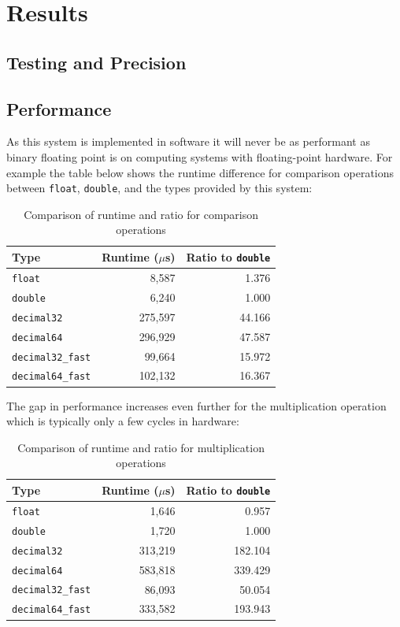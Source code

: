 \documentclass[acmsmall]{acmart}
\newcommand{\code}[1]{\texttt{#1}}
\begin{document}
\section{Results}
\subsection{Testing and Precision}
\subsection{Performance}

As this system is implemented in software it will never be as performant as binary floating point is on computing systems with floating-point hardware.
For example the table below shows the runtime difference for comparison operations between \code{float}, \code{double}, and the types provided by this system:

\begin{table}[t]
\centering
\begin{tabular}{|l|r|r|}
\hline
Type & Runtime ($\mu$s) & Ratio to \texttt{double} \\
\hline
\texttt{float} & 8,587 & 1.376 \\
\texttt{double} & 6,240 & 1.000 \\
\texttt{decimal32} & 275,597 & 44.166 \\
\texttt{decimal64} & 296,929 & 47.587 \\
\texttt{decimal32\_fast} & 99,664 & 15.972 \\
\texttt{decimal64\_fast} & 102,132 & 16.367 \\
\hline
\end{tabular}
\caption{Comparison of runtime and ratio for comparison operations}
\label{tab:comp-comparison}
\end{table}

The gap in performance increases even further for the multiplication operation which is typically only a few cycles in hardware\cite{arm_trm}:

\begin{table}[t]
\centering
\begin{tabular}{|l|r|r|}
\hline
Type & Runtime ($\mu$s) & Ratio to \texttt{double} \\
\hline
\texttt{float} & 1,646 & 0.957 \\
\texttt{double} & 1,720 & 1.000 \\
\texttt{decimal32} & 313,219 & 182.104 \\
\texttt{decimal64} & 583,818 & 339.429 \\
\texttt{decimal32\_fast} & 86,093 & 50.054 \\
\texttt{decimal64\_fast} & 333,582 & 193.943 \\
\hline
\end{tabular}
\caption{Comparison of runtime and ratio for multiplication operations}
\label{tab:mul-comparison}
\end{table}
\end{document}
